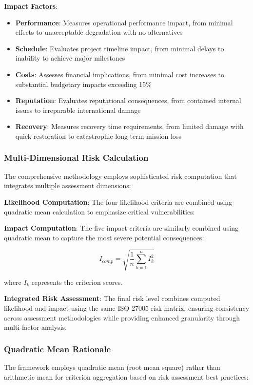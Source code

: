 \documentclass[binding=0.6cm]{sapthesis}
\begin{document}
\textbf{Impact Factors}:
\begin{itemize}
    \item \textbf{Performance}: Measures operational performance impact, from minimal effects to unacceptable degradation with no alternatives
    \item \textbf{Schedule}: Evaluates project timeline impact, from minimal delays to inability to achieve major milestones
    \item \textbf{Costs}: Assesses financial implications, from minimal cost increases to substantial budgetary impacts exceeding 15\%
    \item \textbf{Reputation}: Evaluates reputational consequences, from contained internal issues to irreparable international damage
    \item \textbf{Recovery}: Measures recovery time requirements, from limited damage with quick restoration to catastrophic long-term mission loss
\end{itemize}

\subsubsection{Multi-Dimensional Risk Calculation}

The comprehensive methodology employs sophisticated risk computation that integrates multiple assessment dimensions:

\textbf{Likelihood Computation}: The four likelihood criteria are combined using quadratic mean calculation to emphasize critical vulnerabilities:

\textbf{Impact Computation}: The five impact criteria are similarly combined using quadratic mean to capture the most severe potential consequences:

$$I_{comp} = \sqrt{\frac{1}{n}\sum_{k=1}^{n} I_k^2}$$

where $I_k$ represents the criterion scores.

\textbf{Integrated Risk Assessment}: The final risk level combines computed likelihood and impact using the same ISO 27005 risk matrix, ensuring consistency across assessment methodologies while providing enhanced granularity through multi-factor analysis.

\subsubsection{Quadratic Mean Rationale}

The framework employs quadratic mean (root mean square) rather than arithmetic mean for criterion aggregation based on risk assessment best practices:
\end{document}
